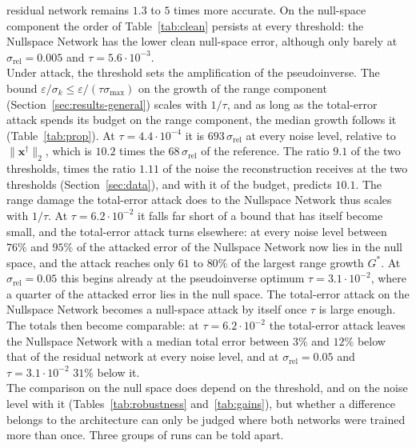 \documentclass{article}
\numberwithin{equation}{section}
\begin{document}
residual network remains $1.3$ to $5$ times more accurate. On the null-space component the order of
Table~\ref{tab:clean} persists at every threshold: the Nullspace Network has the lower clean null-space
error, although only barely at $\sigma_\text{rel}=0.005$ and $\tau=5.6\cdot10^{-3}$.\\
Under attack, the threshold sets the amplification of the pseudoinverse. The bound
$\varepsilon/\sigma_k\leq\varepsilon/(\tau\sigma_{\max})$ on the growth of the range component
(Section~\ref{sec:results-general}) scales with $1/\tau$, and as long as the total-error attack spends its budget on the range
component, the median growth follows it (Table~\ref{tab:prop}). At $\tau=4.4\cdot10^{-4}$ it is
$693\,\sigma_\text{rel}$ at every noise level, relative to $\lVert\mathbf{x}^\dagger\rVert_2$, which is
$10.2$ times the $68\,\sigma_\text{rel}$ of the reference. The ratio $9.1$ of the two thresholds, times the
ratio $1.11$ of the noise the reconstruction receives at the two thresholds (Section~\ref{sec:data}), and
with it of the budget, predicts $10.1$. The range damage the total-error attack does to the Nullspace
Network thus scales with $1/\tau$. At $\tau=6.2\cdot10^{-2}$ it falls far short of a bound that has
itself become small, and the total-error attack turns elsewhere: at every noise level between $76\%$ and
$95\%$ of the attacked error of the Nullspace Network now lies in the null space, and the attack reaches only
$61$ to $80\%$ of the largest range growth $G^*$. At $\sigma_\text{rel}=0.05$ this begins already at the
pseudoinverse optimum $\tau=3.1\cdot10^{-2}$, where a quarter of the attacked error lies in the null space.
The total-error attack on the Nullspace Network becomes a null-space attack by itself once $\tau$ is large
enough. The totals then become comparable: at $\tau=6.2\cdot10^{-2}$ the total-error attack leaves the
Nullspace Network with a median total error between $3\%$ and $12\%$ below that of the residual network at
every noise level, and at $\sigma_\text{rel}=0.05$ and $\tau=3.1\cdot10^{-2}$ $31\%$ below it.\\
The comparison on the null space does depend on the threshold, and on the noise level with it
(Tables~\ref{tab:robustness} and~\ref{tab:gains}), but whether a difference belongs to the architecture
can only be judged where both networks were trained more than once. Three groups of runs can be told apart.
\end{document}
